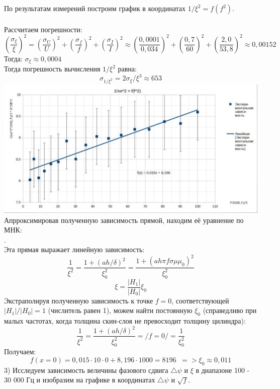 \documentclass[a4paper]{article}
\begin{document}
По результатам измерений построим график в координатах $1/\xi^2 = f(f^2)$.\\
\\
Рассчитаем погрешности:\\
$$ (\frac{\sigma_{\xi}}{\xi})^2 = (\frac{\sigma_{U}}{U})^2 + (\frac{\sigma_{f}}{f})^2 + (\frac{\sigma_{I}}{I})^2 \approx (\frac{0,0001}{0,034})^2 + (\frac{0,7}{60})^2 + (\frac{2,0}{53,8})^2 \approx 0,00152 $$ 
Тогда: $\sigma_{\xi} \approx 0,0004 $\\
Тогда погрешность вычисления $1/\xi^2$ равна:
$$\sigma_{1/\xi^2} = 2\sigma_{\xi}/\xi^3 \approx 653 $$
\includegraphics[width=19cm]{g3}\\
Апрроксимировав полученную зависимость прямой, находим её уравнение по МНК:\\
 .\\
Эта прямая выражает линейную зависимость:
$$\frac{1}{\xi^2} = \frac{1 + (ah/\delta)^2}{\xi^2_0} = \frac{1 + (ah\pi f \sigma \mu \mu_{0})^2}{\xi^2_0}$$
$$ \xi = \frac{|H_1|}{|H_0|}\xi_0$$
Экстраполируя полученную зависимость к точке $f = 0$, соответствующей $|H_1|/|H_0| = 1$ (числитель равен 1), можем найти постоянную $\xi_0$ (справедливо при малых частотах, когда толщина скин-слоя не превосходит толщину цилиндра):
$$\frac{1}{\xi^2} = \frac{1 + (ah/\delta)^2}{\xi^2_0} = /f = 0/ = \frac{1}{\xi^2_0}$$
Получаем:
$$f(x = 0) = 0,015\cdot 10 \cdot 0 + 8,196 \cdot 1000 = 8196 \; \; => \xi_0 \approx 0,011$$
3) Исследуем зависимость величины фазового сдвига $\triangle \psi$ и $\xi$  в диапазоне 100 - 30 000 Гц и изобразим на графике в координатах $\triangle \psi$ и $\sqrt{f}$.\\
\\
\end{document}
